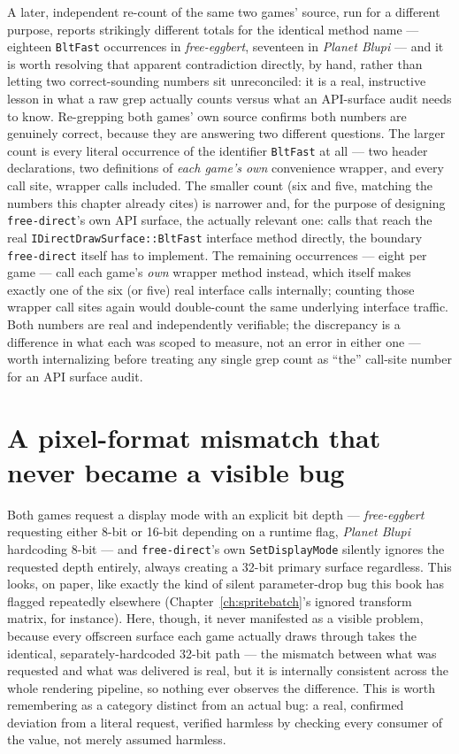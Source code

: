 A later, independent re-count of the same two games' source, run for a different purpose,
reports strikingly different totals for the identical method name --- eighteen
\texttt{BltFast} occurrences in \emph{free-eggbert}, seventeen in \emph{Planet Blupi} --- and
it is worth resolving that apparent contradiction directly, by hand, rather than letting two
correct-sounding numbers sit unreconciled: it is a real, instructive lesson in what a raw
grep actually counts versus what an API-surface audit needs to know. Re-grepping both games'
own source confirms both numbers are genuinely correct, because they are answering two
different questions. The larger count is every literal occurrence of the identifier
\texttt{BltFast} at all --- two header declarations, two definitions of \emph{each game's
own}  convenience wrapper, and every call site, wrapper calls
included. The smaller count (six and five, matching the numbers this chapter already cites)
is narrower and, for the purpose of designing \texttt{free-direct}'s own API surface,
the actually relevant one: calls that reach the real \texttt{IDirectDrawSurface::BltFast}
interface method directly, the boundary \texttt{free-direct} itself has to implement. The
remaining occurrences --- eight per game --- call each game's \emph{own}
 wrapper method instead, which itself makes exactly one of the six
(or five) real interface calls internally; counting those wrapper call sites again would
double-count the same underlying interface traffic. Both numbers are real and independently
verifiable; the discrepancy is a difference in what each was scoped to measure, not an error
in either one --- worth internalizing before treating any single grep count as ``the'' call-site
number for an API surface audit.

\section{A pixel-format mismatch that never became a visible bug}

Both games request a display mode with an explicit bit depth --- \emph{free-eggbert}
requesting either 8-bit or 16-bit depending on a runtime flag, \emph{Planet Blupi} hardcoding
8-bit --- and \texttt{free-direct}'s own \texttt{SetDisplayMode} silently ignores the
requested depth entirely, always creating a 32-bit primary surface regardless. This looks, on
paper, like exactly the kind of silent parameter-drop bug this book has flagged repeatedly
elsewhere (Chapter~\ref{ch:spritebatch}'s ignored transform matrix, for instance). Here,
though, it never manifested as a visible problem, because every offscreen surface each game
actually draws through takes the identical, separately-hardcoded 32-bit path --- the mismatch
between what was requested and what was delivered is real, but it is internally consistent
across the whole rendering pipeline, so nothing ever observes the difference. This is worth
remembering as a category distinct from an actual bug: a real, confirmed deviation from a
literal request, verified harmless by checking every consumer of the value, not merely
assumed harmless.

